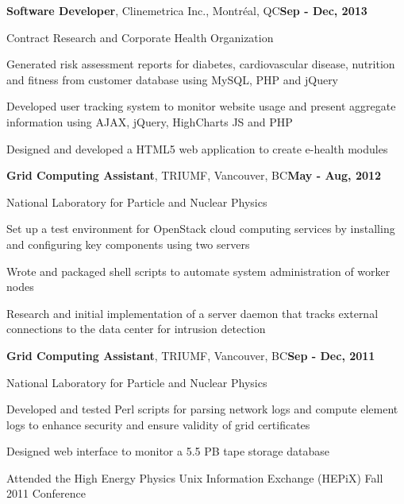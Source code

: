 \documentclass[margin,line]{res}
\newenvironment{list1}{
  \begin{list}{\ding{113}}{
      \setlength{\itemsep}{0in}
      \setlength{\parsep}{0in} \setlength{\parskip}{0in}
      \setlength{\topsep}{0in} \setlength{\partopsep}{0in} 
      \setlength{\leftmargin}{0.17in}}}{\end{list}}
\newenvironment{list3}{
  \begin{list}{\textopenbullet}{
      \setlength{\itemsep}{0in}
      \setlength{\parsep}{0in} \setlength{\parskip}{0in}
      \setlength{\topsep}{0in} \setlength{\partopsep}{0in} 
      \setlength{\leftmargin}{0.1in}}}{\end{list}}
\begin{document}
\begin{resume}
{\bf Software Developer}, Clinemetrica Inc., Montr\'eal, QC\hfill{\bf Sep - Dec, 2013}\\
\vspace*{-.2cm}
\begin{list1}
\item[] Contract Research and Corporate Health Organization
\vspace*{.1cm}
\begin{list3}
\item Generated risk assessment reports for diabetes, cardiovascular disease, nutrition and fitness from customer database using MySQL, PHP and jQuery 
\item Developed user tracking system to monitor website usage and present aggregate information using AJAX, jQuery, HighCharts JS and PHP
\item Designed and developed a HTML5 web application to create e-health modules
\end{list3}
\end{list1}
\vspace*{.1cm}

{\bf Grid Computing Assistant}, TRIUMF, Vancouver, BC\hfill{\bf May - Aug, 2012}\\
\vspace*{-.2cm}
\begin{list1}
\item[] National Laboratory for Particle and Nuclear Physics
\vspace*{.1cm}
\begin{list3}
\item Set up a test environment for OpenStack cloud computing services by installing and configuring key components using two servers
\item Wrote and packaged shell scripts to automate system administration of worker nodes
\item Research and initial implementation of a server daemon that tracks external connections to the data center for intrusion detection
\end{list3}
\end{list1}
\vspace*{.1cm}

{\bf Grid Computing Assistant}, TRIUMF, Vancouver, BC\hfill{\bf Sep - Dec, 2011}\\
\vspace*{-.2cm}
\begin{list1}
\item[] National Laboratory for Particle and Nuclear Physics
\vspace*{.1cm}
\begin{list3}
\item Developed and tested Perl scripts for parsing network logs and compute element logs to enhance security and ensure validity of grid certificates
\item Designed web interface to monitor a 5.5 PB tape storage database
\item Attended the High Energy Physics Unix Information Exchange (HEPiX) Fall 2011 Conference
\end{list3}
\end{list1}


\end{resume}
\end{document}
